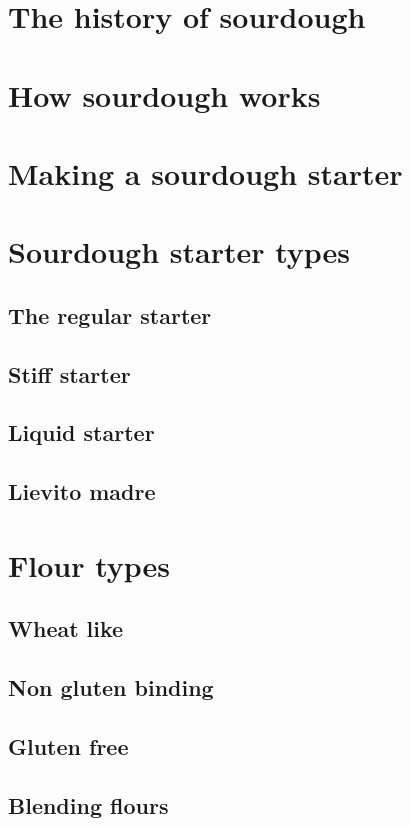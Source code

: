 \documentclass[a4paper, 12pt]{book}
\begin{document}
\mainmatter

\chapter{The history of sourdough}


\chapter{How sourdough works}


\chapter{Making a sourdough starter}


\chapter{Sourdough starter types}
\section{The regular starter}
\section{Stiff starter}
\section{Liquid starter}
\section{Lievito madre}

\chapter{Flour types}
\section{Wheat like}
\section{Non gluten binding}
\section{Gluten free}
\section{Blending flours}
\end{document}
